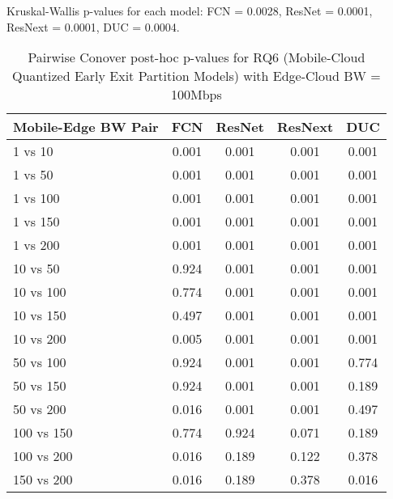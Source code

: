 \begin{table}[h]
\centering
\caption{Pairwise Conover post-hoc p-values for RQ6 (Mobile-Cloud Quantized Early Exit Partition Models) with Edge-Cloud BW = 100Mbps}
\label{tab:conover_mobile_cloud_quantized_earlyexit_partition_ec100}
\smallskip
Kruskal-Wallis p-values for each model: FCN = 0.0028, ResNet = 0.0001, ResNext = 0.0001, DUC = 0.0004.

\begin{tabular}{lcccc}
\toprule
Mobile-Edge BW Pair & FCN & ResNet & ResNext & DUC \\
\midrule
1 vs 10 & 0.001 & 0.001 & 0.001 & 0.001 \\
1 vs 50 & 0.001 & 0.001 & 0.001 & 0.001 \\
1 vs 100 & 0.001 & 0.001 & 0.001 & 0.001 \\
1 vs 150 & 0.001 & 0.001 & 0.001 & 0.001 \\
1 vs 200 & 0.001 & 0.001 & 0.001 & 0.001 \\
10 vs 50 & 0.924 & 0.001 & 0.001 & 0.001 \\
10 vs 100 & 0.774 & 0.001 & 0.001 & 0.001 \\
10 vs 150 & 0.497 & 0.001 & 0.001 & 0.001 \\
10 vs 200 & 0.005 & 0.001 & 0.001 & 0.001 \\
50 vs 100 & 0.924 & 0.001 & 0.001 & 0.774 \\
50 vs 150 & 0.924 & 0.001 & 0.001 & 0.189 \\
50 vs 200 & 0.016 & 0.001 & 0.001 & 0.497 \\
100 vs 150 & 0.774 & 0.924 & 0.071 & 0.189 \\
100 vs 200 & 0.016 & 0.189 & 0.122 & 0.378 \\
150 vs 200 & 0.016 & 0.189 & 0.378 & 0.016 \\
\bottomrule
\end{tabular}
\end{table}

